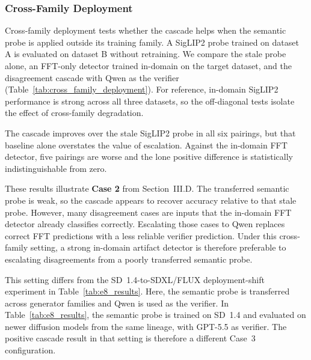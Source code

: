 \documentclass{ieeeaccess}
\begin{document}
\subsubsection{Cross-Family Deployment}
\label{sec:cross_family_deployment}

Cross-family deployment tests whether the cascade helps when the semantic probe is
applied outside its training family. A SigLIP2 probe trained on dataset A is evaluated
on dataset B without retraining. We compare the stale probe alone, an FFT-only detector
trained in-domain on the target dataset, and the disagreement cascade with Qwen as the
verifier (Table~\ref{tab:cross_family_deployment}). For reference, in-domain SigLIP2
performance is strong across all three datasets, so the off-diagonal tests isolate the
effect of cross-family degradation.

The cascade improves over the stale SigLIP2 probe in all six pairings, but that baseline
alone overstates the value of escalation. Against the in-domain FFT detector, five
pairings are worse and the lone positive difference is statistically indistinguishable
from zero.

These results illustrate \textbf{Case 2} from Section~III.D. The transferred semantic
probe is weak, so the cascade appears to recover accuracy relative to that stale probe.
However, many disagreement cases are inputs that the in-domain FFT detector already
classifies correctly. Escalating those cases to Qwen replaces correct FFT predictions
with a less reliable verifier prediction. Under this cross-family setting, a strong
in-domain artifact detector is therefore preferable to escalating disagreements from a
poorly transferred semantic probe.

This setting differs from the SD~1.4-to-SDXL/FLUX deployment-shift experiment in
Table~\ref{tab:e8_results}. Here, the semantic probe is transferred across generator
families and Qwen is used as the verifier. In Table~\ref{tab:e8_results}, the semantic
probe is trained on SD~1.4 and evaluated on newer diffusion models from the same lineage,
with GPT-5.5 as verifier. The positive cascade result in that setting is therefore a
different Case~3 configuration.
\end{document}

